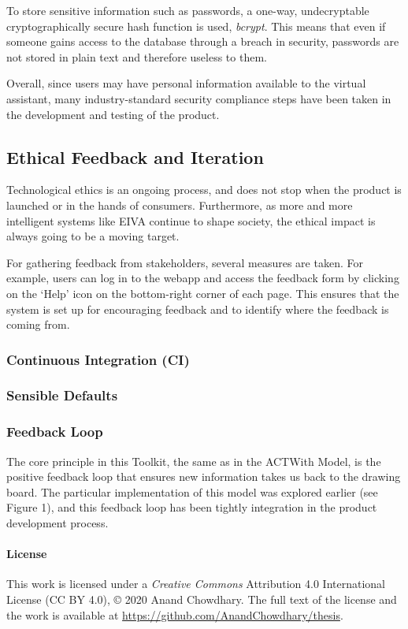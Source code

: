 \documentclass{article}
\begin{document}
To store sensitive information such as passwords, a one-way, undecryptable cryptographically secure hash function is used, \emph{bcrypt}. This means that even if someone gains access to the database through a breach in security, passwords are not stored in plain text and therefore useless to them.

Overall, since users may have personal information available to the virtual assistant, many industry-standard security compliance steps have been taken in the development and testing of the product.

\subsection{Ethical Feedback and Iteration}

Technological ethics is an ongoing process, and does not stop when the product is launched or in the hands of consumers. Furthermore, as more and more intelligent systems like EIVA continue to shape society, the ethical impact is always going to be a moving target.

For gathering feedback from stakeholders, several measures are taken. For example, users can log in to the webapp and access the feedback form by clicking on the `Help' icon on the bottom-right corner of each page. This ensures that the system is set up for encouraging feedback and to identify where the feedback is coming from.

\subsubsection{Continuous Integration (CI)}

\subsubsection{Sensible Defaults}

\subsubsection{Feedback Loop}

The core principle in this Toolkit, the same as in the ACTWith Model, is the positive feedback loop that ensures new information takes us back to the drawing board. The particular implementation of this model was explored earlier (see Figure 1), and this feedback loop has been tightly integration in the product development process.

\begin{multicols}{2}



	
\end{multicols}

\listoffigures

\paragraph{License}

This work is licensed under a \emph{Creative Commons} Attribution 4.0 International License (CC BY 4.0), © 2020 Anand Chowdhary. The full text of the license and the work is available at \url{https://github.com/AnandChowdhary/thesis}.
\end{document}

